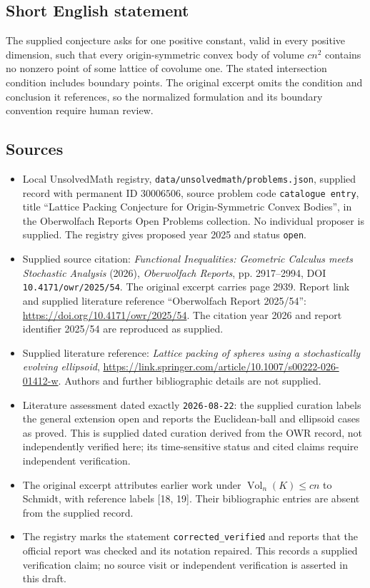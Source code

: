 \documentclass[11pt]{article}
\begin{document}
\subsection{Short English statement}
The supplied conjecture asks for one positive constant, valid in every positive dimension, such that every origin-symmetric convex body of volume \(cn^2\) contains no nonzero point of some lattice of covolume one. The stated intersection condition includes boundary points. The original excerpt omits the condition and conclusion it references, so the normalized formulation and its boundary convention require human review.
\subsection{Sources}
\begin{itemize}
\item Local UnsolvedMath registry, \texttt{data/unsolvedmath/problems.json}, supplied record with permanent ID \(30006506\), source problem code \texttt{catalogue entry}, title ``Lattice Packing Conjecture for Origin-Symmetric Convex Bodies'', in the Oberwolfach Reports Open Problems collection. No individual proposer is supplied. The registry gives proposed year 2025 and status \texttt{open}.
\item Supplied source citation: \emph{Functional Inequalities: Geometric Calculus meets Stochastic Analysis} (2026), \emph{Oberwolfach Reports}, pp. 2917--2994, DOI \texttt{10.4171/owr/2025/54}. The original excerpt carries page 2939. Report link and supplied literature reference ``Oberwolfach Report 2025/54'': \url{https://doi.org/10.4171/owr/2025/54}. The citation year 2026 and report identifier 2025/54 are reproduced as supplied.
\item Supplied literature reference: \emph{Lattice packing of spheres using a stochastically evolving ellipsoid}, \url{https://link.springer.com/article/10.1007/s00222-026-01412-w}. Authors and further bibliographic details are not supplied.
\item Literature assessment dated exactly \texttt{2026-08-22}: the supplied curation labels the general extension open and reports the Euclidean-ball and ellipsoid cases as proved. This is supplied dated curation derived from the OWR record, not independently verified here; its time-sensitive status and cited claims require independent verification.
\item The original excerpt attributes earlier work under \(\operatorname{Vol}_n(K)\leq cn\) to Schmidt, with reference labels [18, 19]. Their bibliographic entries are absent from the supplied record.
\item The registry marks the statement \texttt{corrected\_verified} and reports that the official report was checked and its notation repaired. This records a supplied verification claim; no source visit or independent verification is asserted in this draft.
\end{itemize}
\end{document}
